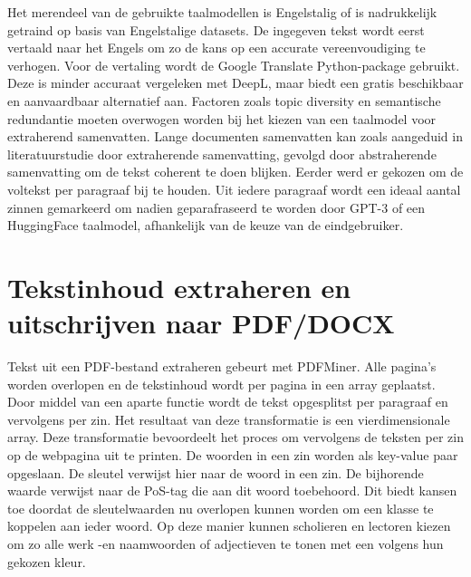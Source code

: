 Het merendeel van de gebruikte taalmodellen is Engelstalig of is nadrukkelijk getraind op basis van Engelstalige datasets. De ingegeven tekst wordt eerst vertaald naar het Engels om zo de kans op een accurate vereenvoudiging te verhogen. Voor de vertaling wordt de Google Translate Python-package gebruikt. Deze is minder accuraat vergeleken met DeepL, maar biedt een gratis beschikbaar en aanvaardbaar alternatief aan. Factoren zoals topic diversity en semantische redundantie moeten overwogen worden bij het kiezen van een taalmodel voor extraherend samenvatten. Lange documenten samenvatten kan zoals aangeduid in literatuurstudie door extraherende samenvatting, gevolgd door abstraherende samenvatting om de tekst coherent te doen blijken. Eerder werd er gekozen om de voltekst per paragraaf bij te houden. Uit iedere paragraaf wordt een ideaal aantal zinnen gemarkeerd om nadien geparafraseerd te worden door GPT-3 of een HuggingFace taalmodel, afhankelijk van de keuze van de eindgebruiker.


\section{Tekstinhoud extraheren en uitschrijven naar PDF/DOCX}


Tekst uit een PDF-bestand extraheren gebeurt met PDFMiner. Alle pagina's worden overlopen en de tekstinhoud wordt per pagina in een array geplaatst. Door middel van een aparte functie wordt de tekst opgesplitst per paragraaf en vervolgens per zin. Het resultaat van deze transformatie is een vierdimensionale array. Deze transformatie bevoordeelt het proces om vervolgens de teksten per zin op de webpagina uit te printen. De woorden in een zin worden als key-value paar opgeslaan. De sleutel verwijst hier naar de woord in een zin. De bijhorende waarde verwijst naar de PoS-tag die aan dit woord toebehoord. Dit biedt kansen toe doordat de sleutelwaarden nu overlopen kunnen worden om een klasse te koppelen aan ieder woord. Op deze manier kunnen scholieren en lectoren kiezen om zo alle werk -en naamwoorden of adjectieven te tonen met een volgens hun gekozen kleur.


